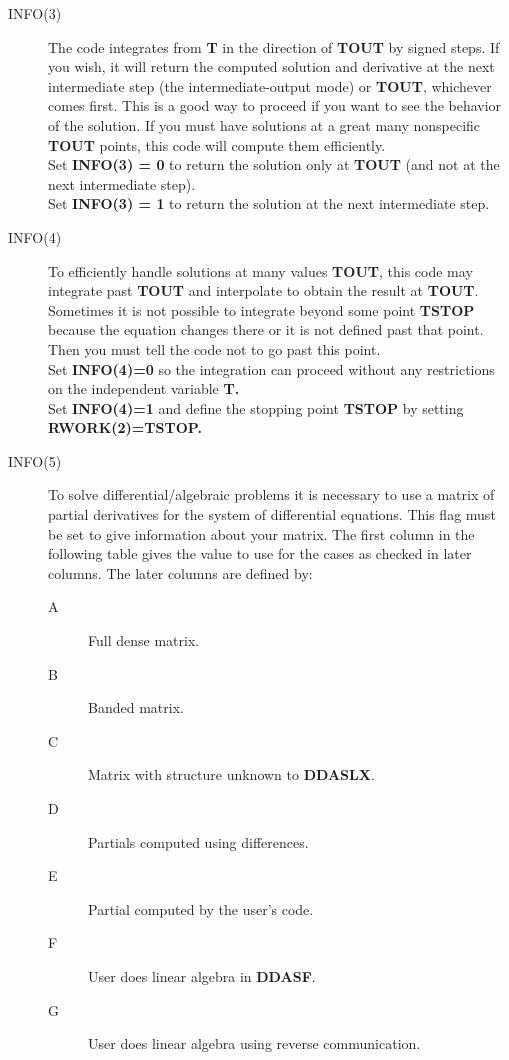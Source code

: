 \documentclass[twoside]{MATH77}
\begin{document}
\begin{description}
\item[INFO(3)] \label{info3} The code integrates from \textbf{T} in
  the direction of \textbf{TOUT} by signed steps.  If you wish, it
  will return the computed solution and derivative at the next
  intermediate step (the intermediate-output mode) or \textbf{TOUT},
  whichever comes first.  This is a good way to proceed if you want to
  see the behavior of the solution.  If you must have solutions at a
  great many nonspecific \textbf{TOUT} points,
  this  code will compute them efficiently.\\
  Set \textbf{INFO(3) = 0 }to return the solution only at
  \textbf{TOUT} (and not at the next intermediate
  step).\\
  Set \textbf{INFO(3) = 1 }to return the solution at the next
  intermediate step.
\item[INFO(4)] \label{info4} To efficiently handle solutions at many
  values \textbf{TOUT}, this code may integrate past \textbf{TOUT} and
  interpolate to obtain the result at \textbf{TOUT}. Sometimes it is
  not possible to integrate beyond some point \textbf{TSTOP} because
  the equation changes there or it is not defined past that point.
  Then you must tell the code not to go past this
  point.\\
  Set \textbf{INFO(4)=0} so the integration can proceed without any
  restrictions on the independent variable \textbf{T.}\\
  Set \textbf{INFO(4)=1} and define the stopping point \textbf{TSTOP}
  by setting \textbf{RWORK(2)=TSTOP.}
\item[INFO(5)] \label{info5} To solve differential/algebraic problems
  it is necessary to use a matrix of partial derivatives for the
  system of differential equations.  This flag must be set to give
  information about your matrix.  The first column in the following
  table gives the value to use for the cases as checked in later
  columns.  The later columns are defined by:
  \begin{description}
  \item[A] Full dense matrix.
  \item[B] Banded matrix.
  \item[C] Matrix with structure unknown to \textbf{DDASLX}.
  \item[D] Partials computed using differences.
  \item[E] Partial computed by the user's code.
  \item[F] User does linear algebra in \textbf{DDASF}.
  \item[G] User does linear algebra using reverse communication.
  \end{description}


\end{description}
\end{document}

